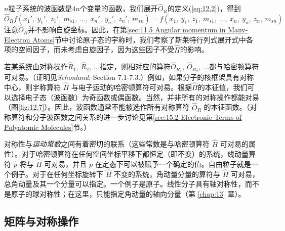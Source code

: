     $n$粒子系统的波函数是$4n$个变量的函数，我们展开$\hat{O}_R$的定义(\ref{eq:12.2})，得到
    \begin{equation*}
        \hat{O}_Rf\left(x_1',\:y_1',\:z_1',\:m_{s1},\:\ldots,\:x_n',\:y_n',\:z_n',\:m_{sn}\right) = f\left(x_1,\:y_1,\:z_1,\:m_{s1},\:\ldots,\:x_n,\:y_n,\:z_n,\:m_{sn}\right)
    \end{equation*}
    注意$\hat{O}_R$并不影响自旋坐标。因此，在第\ref{sec:11.5 Angular momentum in Many-Electron Atoms}节中讨论原子态的宇称时，我们考察了斯莱特行列式展开式中各项的空间因子，而未考虑自旋因子，因为这些因子不受$\hat{\Pi}$的影响。

    若某系统由对称操作$\hat{R}_1,\:\hat{R}_2,\:\ldots$指定，则相对应的算符$\hat{O}_{R_1},\:\hat{O}_{R_2},\:\ldots$都与哈密顿算符可对易。（证明见\textit{Schonland}, Section 7.1-7.3.）例如，如果分子的核框架具有对称中心，则宇称算符 $\hat{\Pi}$ 与电子运动的哈密顿算符可对易。根据$\hat{\Pi}$的本征值，我们可以选择电子态（波函数）为奇函数或偶函数。当然，并非所有的对称操作都能对易（图\ref{fig:12.7}）。因此，波函数通常不能被选作所有对称算符 $\hat{O}_R$ 的本征函数。（对称算符和分子波函数之间关系的进一步讨论见第\ref{sec:15.2 Electronic Terms of Polyatomic Molecules}节。）

    对称性与\textit{运动常数}之间有着密切的联系（这些常数是与哈密顿算符 $\hat{H}$ 可对易的属性）。对于哈密顿算符在任何空间坐标平移下都恒定（即不变）的系统，线动量算符 $\hat{p}$ 将与 $\hat{H}$ 可对易，并且 $p$ 在定态下可以被赋予一个确定的值。自由粒子就是一个例子。对于在任何坐标旋转下 $\hat{H}$ 不变的系统，角动量分量的算符与 $\hat{H}$ 可对易，总角动量及其一个分量可以指定。一个例子是原子。线性分子具有轴对称性，而不是原子的球对称性；在这里，只能指定角动量的轴向分量（第 \ref{chap:13} 章）。

\subsection*{矩阵与对称操作}

